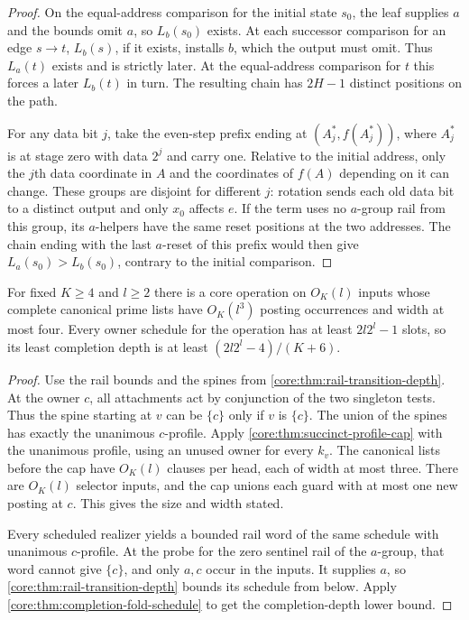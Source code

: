 \begin{proof}
On the equal-address comparison for the initial state $s_0$, the
leaf supplies $a$ and the bounds omit $a$, so $L_b(s_0)$ exists.
At each successor comparison for an edge $s\to t$, $L_b(s)$, if
it exists, installs $b$, which the output must omit. Thus $L_a(t)$
exists and is strictly later. At the equal-address comparison for
$t$ this forces a later $L_b(t)$ in turn. The resulting chain has
$2H-1$ distinct positions on the path.

For any data bit $j$, take the even-step prefix ending at
$(A_j^*,f(A_j^*))$, where $A_j^*$ is at stage zero with data
$2^j$ and carry one. Relative to the initial address, only
the $j$th data coordinate in $A$ and the coordinates of $f(A)$
depending on it can change. These groups are disjoint for
different $j$: rotation sends each old data bit to a distinct
output and only $x_0$ affects $e$. If the term uses no $a$-group
rail from this group, its $a$-helpers have the same reset
positions at the two addresses. The chain ending with the
last $a$-reset of this prefix would then give
$L_a(s_0)>L_b(s_0)$, contrary to the initial comparison.
\end{proof}

\begin{corollary}
\label{core:cor:exact-prime-exponential-depth}
For fixed $K\ge4$ and $l\ge2$ there is a core operation on $O_K(l)$
inputs whose complete canonical prime lists have $O_K(l^3)$ posting
occurrences and width at most four. Every owner schedule for the
operation has at least $2l2^l-1$ slots, so its least completion depth
is at least $(2l2^l-4)/(K+6)$.
\end{corollary}
\begin{proof}
Use the rail bounds and the spines from
\cref{core:thm:rail-transition-depth}. At the owner $c$, all
attachments act by conjunction of the two singleton tests.
Thus the spine starting at $v$ can be $\{c\}$ only if $v$ is
$\{c\}$. The union of the spines has exactly the unanimous
$c$-profile. Apply \cref{core:thm:succinct-profile-cap} with the
unanimous profile, using an unused owner for every $k_v$.
The canonical lists before the cap have $O_K(l)$ clauses per head,
each of width at most three. There are $O_K(l)$ selector inputs,
and the cap unions each guard with at most one new posting at $c$.
This gives the size and width stated.

Every scheduled realizer yields a bounded rail word of the same
schedule with unanimous $c$-profile. At the probe for the zero sentinel
rail of the $a$-group, that word cannot give $\{c\}$, and only
$a,c$ occur in the inputs. It supplies $a$, so
\cref{core:thm:rail-transition-depth} bounds its schedule from
below. Apply \cref{core:thm:completion-fold-schedule} to get the
completion-depth lower bound.
\end{proof}

